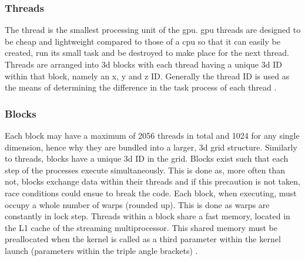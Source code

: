 \subsubsection{Threads}\label{gpu:ssec:thread}
The thread is the smallest processing unit of the \gls{gpu}. \gls{gpu} threads are designed to be cheap and lightweight compared to those of a \gls{cpu} so that it can easily be created, run its small task and be destroyed to make place for the next thread. Threads are arranged into \gls{3d} blocks with each thread having a unique \gls{3d} ID within that block, namely an x, y and z ID. Generally the thread ID is used as the means of determining the difference in the task process of each thread \citep{CUDA}.
%
\subsubsection{Blocks}\label{gpu:ssec:block}
Each block may have a maximum of 2056 threads in total and 1024 for any single dimension, hence why they are bundled into a larger, \gls{3d} grid structure. Similarly to threads, blocks have a unique \gls{3d} ID in the grid. Blocks exist such that each step of the processes execute simultaneously. This is done as, more often than not, blocks exchange data within their threads and if this precaution is not taken, race conditions could ensue to break the code. Each block, when executing, must occupy a whole number of warps (rounded up). This is done as warps are constantly in lock step. Threads within a block share a fast memory, located in the L1 cache of the streaming multiprocessor. This shared memory must be preallocated when the kernel is called as a third parameter within the kernel launch (parameters within the triple angle brackets) \citep{CUDA}.
%
